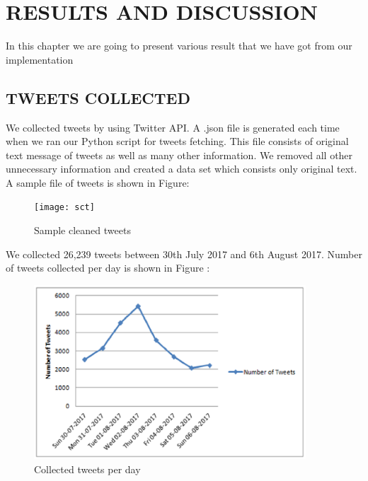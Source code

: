 \chapter{RESULTS AND DISCUSSION}
In this chapter we are going to present various result that we have got from our implementation 
\section{TWEETS COLLECTED}
We collected tweets  by using Twitter API.  A .json file is generated each time when we ran our Python script for tweets fetching. This file consists of original text message of tweets as well as many other information. We removed all other unnecessary information and created a data set which consists only original text.
A sample file of tweets is shown in Figure:
\begin{figure}[h]
\label{sct}
\centerline{\texttt{[image: sct]}}
\caption{Sample cleaned tweets}
\end{figure}
We collected 26,239  tweets between  30th July 2017 and  6th August 2017.
Number of tweets collected per day is shown in Figure :

\begin{figure}[h]
\label{ut}
\centerline{\includegraphics[width=4in]{ut}}
\caption{Collected tweets per day}
\end{figure}
